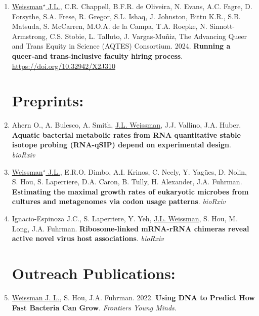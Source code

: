 \documentclass[]{res}
\begin{document}
\begin{resume}
\begin{enumerate}
\section{Whitepapers:} \vspace{0mm}

\item \underline{Weissman$^\star$ J.L.}, C.R. Chappell, B.F.R. de Oliveira, N. Evans, A.C. Fagre, D. Forsythe, S.A. Frese, R. Gregor, S.L. Ishaq, J. Johnston, Bittu K.R., S.B. Matsuda, S. McCarren, M.O.A. de la Campa, T.A. Roepke, N. Sinnott-Armstrong, C.S. Stobie, L. Talluto, J. Vargas-Muñiz, The Advancing Queer and Trans Equity in Science (AQTES) Consortium. 2024. {\bf Running a queer-and trans-inclusive faculty hiring process}. \url{https://doi.org/10.32942/X2J310}

\section{Preprints:} \vspace{0mm}

\item Ahern O., A. Bulesco, A. Smith, \underline{J.L. Weissman}, J.J. Vallino, J.A. Huber. {\bf Aquatic bacterial metabolic rates from RNA quantitative stable isotope probing (RNA-qSIP) depend on experimental design}. \emph{bioRxiv}

\item \underline{Weissman$^\star$ J.L.}, E.R.O. Dimbo, A.I. Krinos, C. Neely, Y. Yag\"{ues}, D. Nolin, S. Hou, S. Laperriere, D.A. Caron, B. Tully, H. Alexander, J.A. Fuhrman. {\bf Estimating the maximal growth rates of eukaryotic microbes from cultures and metagenomes via codon usage patterns}. \emph{bioRxiv}

\item Ignacio-Espinoza J.C., S. Laperriere, Y. Yeh, \underline{J.L. Weissman}, S. Hou, M. Long, J.A. Fuhrman. {\bf Ribosome-linked mRNA-rRNA chimeras reveal active novel virus host associations}. \emph{bioRxiv}

\section{Outreach Publications:} \vspace{0mm}

\item \underline{Weissman J. L.}, S. Hou, J.A. Fuhrman. 2022. {\bf Using DNA to Predict How Fast Bacteria Can Grow}. \emph{Frontiers Young Minds.}


\end{enumerate}
\end{resume}
\end{document}
